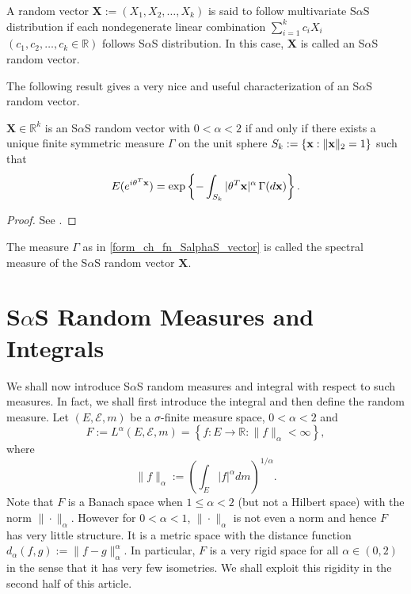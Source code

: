 \documentclass[12pt]{amsart}
\begin{document}
\begin{defn} A random vector ${\mathbf{X}}:=(X_1, X_2, \ldots, X_k)$ is said to follow multivariate S$\alpha$S distribution if each nondegenerate linear combination $\sum_{i=1}^k c_i X_i$ $(c_1, c_2, \ldots, c_k \in \mathbb{R})$ follows S$\alpha$S distribution. In this case, ${\mathbf{X}}$ is called an S$\alpha$S random vector.
\end{defn}

The following result gives a very nice and useful characterization of an S$\alpha$S random vector.

\begin{thm}\label{thm_ch_fn_SalphaS_vector} ${\mathbf{X}} \in \mathbb{R}^k$ is an S$\alpha$S random vector with $0<\alpha<2$ if and only if there exists a unique finite symmetric measure $\Gamma$ on the unit sphere $S_k:=\{{{\bf x}}: \|{{\bf x}}\|_2=1\}$ such that
\begin{equation}
E(e^{i {{\mathbf{\theta}}}^{T}{{\bf x}}})=\exp\left\{-\int_{S_k}|{{\mathbf{\theta}}}^{T}{{\bf x}}|^\alpha\,\Gamma(d{{\bf x}})\right\}. \label{form_ch_fn_SalphaS_vector}
\end{equation}
\end{thm}

\begin{proof} See \cite{kuelbs:1973}.
\end{proof}

\begin{defn} The measure $\Gamma$ as in \eqref{form_ch_fn_SalphaS_vector} is called the spectral measure of the S$\alpha$S random vector ${\mathbf{X}}$.
\end{defn}

\section{S$\alpha$S Random Measures and Integrals} \label{sec:sas_rm_int}

We shall now introduce S$\alpha$S random measures and integral with respect to such measures. In fact, we shall first introduce the integral and then define the random measure. Let $(E, \mathcal{E}, m)$ be a $\sigma$-finite measure space, $0<\alpha<2$ and
\[
F:=L^\alpha(E, \mathcal{E}, m)=\left\{f:E \to \mathbb{R}: \|f\|_\alpha<\infty\right\},
\]
where 
\[
\|f\|_\alpha:=\left(\int_E |f|^\alpha dm\right)^{1/\alpha}.
\]
Note that $F$ is a Banach space when $1 \leq \alpha <2$ (but not a Hilbert space) with the norm $\|\cdot\|_\alpha$. However for $0<\alpha<1$, $\|\cdot\|_\alpha$ is not even a norm and hence $F$ has very little structure. It is a metric space with the distance function $d_\alpha(f,g):=\|f-g\|_\alpha^\alpha$. In particular, $F$ is a very rigid space for all $\alpha \in (0,2)$ in the sense that it has very few isometries. We shall exploit this rigidity in the second half of this article.
\end{document}
